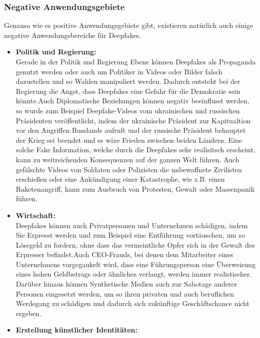 \subsubsection{Negative Anwendungsgebiete}
Genauso wie es positive Anwendungsgebiete gibt, existieren natürlich auch einige negative Anwendungsbereiche für Deepfakes.
\begin{itemize}
    \item \textbf{Politik und Regierung:} \\
    Gerade in der Politik und Regierung Ebene können Deepfakes als Propaganda genutzt werden oder auch um Politiker in Videos oder Bilder falsch dazustellen und so Wahlen manipuliert werden. Dadurch entsteht bei der Regierung die Angst, dass Deepfakes eine Gefahr für die Demokratie sein könnte.\cite{ResearchGate}\newline Auch Diplomatische Beziehungen können negativ beeinflusst werden, so wurde zum Beispiel Deepfake-Videos vom ukrainischen und russischen Präsidenten veröffentlicht, indem der ukrainische Präsident zur Kapitualtion vor den Angriffen Russlands aufruft und der russische Präsident behauptet der Krieg sei beendet und es wäre Frieden zwischen beiden Ländern. Eine solche Fake Information, welche durch die Deepfakes sehr realisitsch erscheint, kann zu weitreichenden Konsequenzen auf der ganzen Welt führen. Auch gefälschte Videos von Soldaten oder Polizisten die unbewaffnete Zivilisten erschießen oder eine Ankündigung einer Katastrophe, wie z.B. einen Raketenangriff, kann zum Ausbruch von Protesten, Gewalt oder Massenpanik führen.\cite{SpringerLink}
    \item \textbf{Wirtschaft:} \\
    Deepfakes können auch Privatpersonen und Unternehmen schädigen, indem Sie Erpresst werden und zum Beispiel eine Entführung vortäuschen, um so Lösegeld zu fordern, ohne dass das vermeintliche Opfer sich in der Gewalt des Erpresser befindet.\newline Auch CEO-Frauds, bei denen dem Mitarbeiter eines Unternehmens vorgegaukelt wird, dass eine Führungsperson eine Überweisung eines hohen Geldbetrags oder ähnliches verlangt, werden immer realistischer. Darüber hinaus können Synthetische Medien auch zur Sabotage anderer Personen eingesetzt werden, um so ihren privaten und auch beruflichen Werdegang zu schädigen und dadurch sich zukünftige Geschäftschance nicht ergeben.\cite{SpringerLink}
    \item \textbf{Erstellung künstlicher Identitäten:} \\

\end{itemize}
